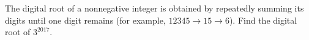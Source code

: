 The digital root of a nonnegative integer is obtained by repeatedly summing its digits until one digit remains (for example, $12345\to15\to6$). Find the digital root of $3^{2017}$.
